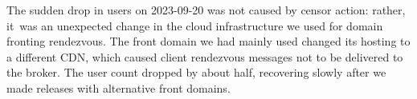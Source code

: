 \documentclass[letterpaper,twocolumn]{article}
\begin{document}
The sudden drop in users on \mbox{2023-09-20}
was not caused by censor action:
rather, it~was an unexpected change in the cloud
infrastructure we used for domain fronting rendezvous.
The front domain we had mainly used
changed its hosting to a different CDN,
which caused client rendezvous messages not to be delivered to the broker.
The user count dropped by about half,
recovering slowly after we made releases
with alternative front domains.
\end{document}
